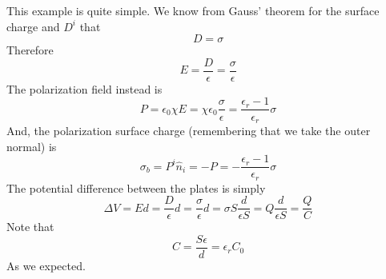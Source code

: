 \documentclass[../electromagnetism]{subfiles}
\begin{document}
\begin{eg}
	This example is quite simple. We know from Gauss' theorem for the surface charge and $D^i$ that
	\begin{equation*}
		D=\sigma
	\end{equation*}
	Therefore
	\begin{equation*}
		E=\frac{D}{\epsilon}=\frac{\sigma}{\epsilon}
	\end{equation*}
	The polarization field instead is
	\begin{equation*}
		P=\epsilon_0\chi E=\chi\epsilon_0\frac{\sigma}{\epsilon}=\frac{\epsilon_r-1}{\epsilon_r}\sigma
	\end{equation*}
	And, the polarization surface charge (remembering that we take the outer normal) is
	\begin{equation*}
		\sigma_b=P^i\hat{n}_i=-P=-\frac{\epsilon_r-1}{\epsilon_r}\sigma
	\end{equation*}
	The potential difference between the plates is simply
	\begin{equation*}
		\Delta V=Ed=\frac{D}{\epsilon}d=\frac{\sigma}{\epsilon}d=\sigma S\frac{d}{\epsilon S}=Q\frac{d}{\epsilon S}=\frac{Q}{C}
	\end{equation*}
	Note that
	\begin{equation*}
		C=\frac{S\epsilon}{d}=\epsilon_rC_0
	\end{equation*}
	As we expected.
\end{eg}
\end{document}
